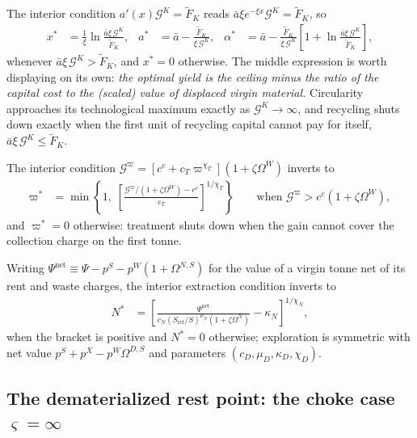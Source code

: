  The interior condition $a'\left(x\right)\mathcal G^K=\tilde F_K$ reads $\bar a\xi e^{-\xi x}\mathcal G^K=\tilde F_K$, so
\begin{align}
x^* &= \frac{1}{\xi}\ln\frac{\bar a\xi\,\mathcal G^K}{\tilde F_K},
&
a^* &= \bar a-\frac{\tilde F_K}{\xi\,\mathcal G^K},
&
\alpha^* &= \bar a-\frac{\tilde F_K}{\xi\,\mathcal G^K}\left[1+\ln\frac{\bar a\xi\,\mathcal G^K}{\tilde F_K}\right],
\label{eq:app:wh:xstar}
\end{align}
whenever $\bar a\xi\,\mathcal G^K>\tilde F_K$, and $x^*=0$ otherwise. The middle expression is worth displaying on its own: \emph{the optimal yield is the ceiling minus the ratio of the capital cost to the (scaled) value of displaced virgin material.} Circularity approaches its technological maximum exactly as $\mathcal G^K\to\infty$, and recycling shuts down exactly when the first unit of recycling capital cannot pay for itself, $\bar a\xi\,\mathcal G^K\le\tilde F_K$.

 The interior condition $\mathcal G^\varpi=\left[c^c+c_T\varpi^{\chi_T}\right]\left(1+\zeta\Omega^W\right)$ inverts to
\begin{align}
\varpi^* &= \min\left\{1,\;\left[\frac{\mathcal G^\varpi/\left(1+\zeta\Omega^W\right)-c^c}{c_T}\right]^{1/\chi_T}\right\}
\qquad\text{when }\mathcal G^\varpi>c^c\left(1+\zeta\Omega^W\right),
\label{eq:app:wh:varpistar}
\end{align}
and $\varpi^*=0$ otherwise: treatment shuts down when the gain cannot cover the collection charge on the first tonne.

 Writing $\Psi^{\mathrm{net}}\equiv\Psi-p^S-p^W\left(1+\Omega^{N,S}\right)$ for the value of a virgin tonne net of its rent and waste charges, the interior extraction condition inverts to
\begin{align}
N^* &= \left[\frac{\Psi^{\mathrm{net}}}{c_N\left(S_{\mathrm{ref}}/S\right)^{\mu_N}\left(1+\zeta\Omega^N\right)}-\kappa_N\right]^{1/\chi_N},
\label{eq:app:wh:Nstar}
\end{align}
when the bracket is positive and $N^*=0$ otherwise; exploration is symmetric with net value $p^S+p^X-p^W\Omega^{D,S}$ and parameters $\left(c_D,\mu_D,\kappa_D,\chi_D\right)$.

\subsection{The dematerialized rest point: the choke case $\varsigma=\infty$}\label{sec:app:workhorse:restpoint}

